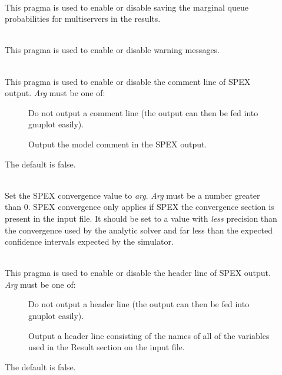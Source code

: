 \begin{description}
\item[]~\\
This pragma is used to enable or disable saving the marginal queue probabilities for multiservers in the results.
\item[]~\\
This pragma is used to enable or disable warning messages.
\begin{description}
\item[]
\item[]
\item[]
\item[]
\end{description}
\item[]~\\
This pragma is used to enable or disable the comment line of SPEX output.
\emph{Arg} must be one of: 
\begin{description}
\item[]
Do not output a comment line (the output can then be fed into gnuplot easily).
\item[]
Output the model comment in the SPEX output.
\end{description}
The default is false.
\item[]~\\
Set the SPEX convergence value to \emph{arg}.  
\emph{Arg} must be a number greater than 0.
SPEX convergence only applies if SPEX the convergence section is present in the input file.
It should be set to a value with \emph{less} precision than the convergence
used by the analytic solver and far less than the expected confidence intervals expected by
the simulator.
\item[]~\\
This pragma is used to enable or disable the header line of SPEX output.
\emph{Arg} must be one of: 
\begin{description}
\item[]
Do not output a header line (the output can then be fed into gnuplot easily).
\item[]
Output a header line consisting of the names of all of the variables used in the Result section on the input file.
\end{description}
The default is false.

\end{description}
